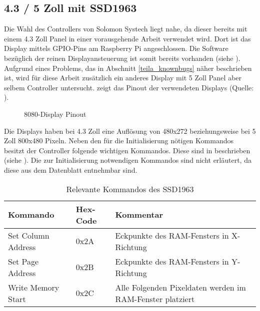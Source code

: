 \subsection{4.3 / 5 Zoll mit SSD1963}
Die Wahl des Controllers  von Solomon Systech liegt nahe, da dieser bereits mit einem 4.3 Zoll  Panel in einer vorausgehende Arbeit verwendet wird. Dort ist das Display mittels GPIO-Pins am Raspberry Pi angeschlossen. Die Software bezüglich der reinen Displayansteuerung ist somit bereits vorhanden (siehe \cite{Schlegel2013a}). Aufgrund eines Problems, das in Abschnitt \ref{teila_knownbugs} näher beschrieben ist, wird für diese Arbeit zusätzlich ein anderes Display mit 5 Zoll Panel aber selbem Controller untersucht. 
 zeigt das Pinout der verwendeten Displays (Quelle: \cite{Coldtears2014}).
\begin{figure}[h]
	\centering
{}
	\caption{8080-Display Pinout}
	\label{fig:8080_pinout}
\end{figure}
Die Displays haben bei 4.3 Zoll eine Auflösung von 480x272 beziehungsweise bei 5 Zoll 800x480 Pixeln. Neben den für die Initialisierung nötigen Kommandos besitzt der Controller folgende wichtigen Kommandos. Diese sind in  beschrieben (siehe \cite{SSD2008}). Die zur Initialisierung notwendigen Kommandos sind nicht erläutert, da diese aus dem Datenblatt entnehmbar sind.
\begin{table}[h]
\begin{tabular}{|p{4cm}|p{1cm}|p{8cm}|}\hline
\rowcolor{TableBackgroundColor} 
   \textbf{Kommando} & \textbf{Hex-Code} & \textbf{Kommentar}\\ \hline
   Set Column Address & 0x2A & Eckpunkte des RAM-Fensters in X-Richtung \\ \hline
   Set Page Address & 0x2B & Eckpunkte des RAM-Fensters in Y-Richtung \\ \hline
   Write Memory Start & 0x2C & Alle Folgenden Pixeldaten werden im RAM-Fenster platziert \\ \hline
\end{tabular}
\caption{Relevante Kommandos des SSD1963}
\label{tab:Kommandos_SSD1963}
\end{table}
